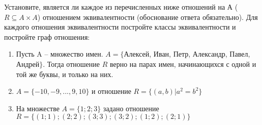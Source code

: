 \question
Установите, является ли каждое из перечисленных ниже отношений на А ($R \subseteq A \times A$) отношением эквивалентности (обоснование ответа обязательно). Для каждого отношения эквивалентности постройте классы 
эквивалентности и постройте граф отношения:
\begin{enumerate}
	\renewcommand{\labelenumi}{\alph{enumi})}
	\item Пусть A -- множество имен. $A = \{ $Алексей, Иван, Петр, Александр, Павел, Андрей$ \}$. Тогда отношение $R$ верно на парах имен, начинающихся с одной и той же буквы, и только на них.
	\item $A = \{-10, -9, ..., 9, 10\}$ и отношение $ R = \{(a,b)|a^{2} = b^{2}\}$
	\item На множестве $A = \{1; 2; 3\}$ задано отношение $R = \{(1; 1); (2; 2); (3; 3); (3; 2); (1; 2); (2; 1)\}$
\end{enumerate}